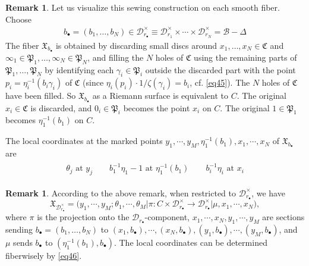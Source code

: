 \documentclass[11pt,b5paper,notitlepage]{article}
\theoremstyle{definition}
\newtheorem{rem}[df]{Remark}
\theoremstyle{plain}
\newcommand{\fk}{\mathfrak}
\newcommand{\mc}{\mathcal}
\newcommand{\blt}{\bullet}
\newcommand{\<}{\left\langle}
\renewcommand{\>}{\right\rangle}
\newcommand{\fx}{\mathfrak{X}}
\newcommand{\MD}{\mathcal{D}}
\numberwithin{equation}{subsection}
\begin{document}
\begin{rem}
Let us visualize this sewing construction on each smooth fiber. Choose
\begin{align*}
b_\blt=(b_1,\dots,b_N)\in\mc D_{r_\blt}^\times\equiv\mc D_{r_1}^\times\times\cdots\times\mc D_{r_N}^\times=\mc B-\Delta
\end{align*}
The fiber $\fk X_{b_\blt}$ is obtained by discarding small discs around $x_1,\dots,x_N\in\fk C$ and $\infty_1\in\fk P_1,\dots,\infty_N\in\fk P_N$, and filling the $N$ holes of $\fk C$ using the remaining parts of $\fk P_1,\dots,\fk P_N$ by identifying each $\gamma_i\in\fk P_i$ outside the discarded part with the point $p_i=\eta_i^{-1}(b_i\gamma_i)$ of $\fk C$ (since $\eta_i(p_i)\cdot 1/\zeta(\gamma_i)=b_i$, cf. \eqref{eq45}). The $N$ holes of $\fk C$ have been filled. So $\fk X_{b_\blt}$ as a Riemann surface is equivalent to $C$. The original $x_i\in\fk C$ is discarded, and $0_i\in\fk P_i$ becomes the point $x_i$ on $C$. The original $1\in\fk P_1$ becomes $\eta_1^{-1}(b_1)$ on $C$.

The local coordinates at the marked points $y_1,\cdots,y_M,\eta_1^{-1}(b_1),x_1,\cdots,x_N$ of $\fk X_{b_\blt}$ are
\begin{gather}\label{eq46}
\begin{gathered}
\theta_j\text{ at }y_j\qquad b_1^{-1}\eta_1-1\text{ at }\eta_1^{-1}(b_1)\qquad b_i^{-1}\eta_i\text{ at }x_i
\end{gathered}
\end{gather}
\end{rem}

\begin{rem}
According to the above remark, when restricted to $\mc D_{r_\blt}^\times$, we have
    $$
    \fx_{\MD_{r_\blt}^\times}=\big(y_1,\cdots,y_M;\theta_1,\cdots,\theta_M\big|\pi:C\times \MD_{r_\blt}^\times \rightarrow \MD_{r_\blt }^\times\big|\mu,x_1,\cdots,x_N\big),
    $$
    where $\pi$ is the projection onto the $\MD_{r_\blt}$-component, $x_1,\cdots,x_N,y_1,\cdots,y_M$ are sections sending $b_\blt=(b_1,\dots,b_N)$ to $(x_1,b_\blt),\cdots,(x_N,b_\blt),(y_1,b_\blt),\cdots,(y_M,b_\blt)$, and $\mu$ sends $b_\blt$ to $(\eta_1^{-1}(b_1),b_\blt)$. The local coordinates can be determined fiberwisely by \eqref{eq46}.
\end{rem}
\end{document}
